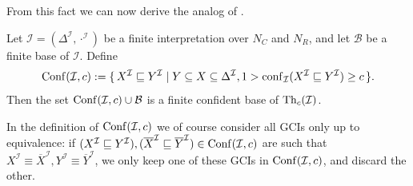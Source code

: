 From this fact we can now derive the analog of .

\begin{Theorem}
  \label{thm:conf-base}
  Let $\mathcal{I} = (\Delta^{\mathcal{I}}, \cdot^{\mathcal{I}})$ be a finite
  interpretation over $N_C$ and $N_R$, and let $\mathcal{B}$ be a finite base of
  $\mathcal{I}$.  Define
  \begin{equation*}
    \operatorname{Conf}(\mathcal{I}, c) := {\{\, X^{\mathcal{I}} \sqsubseteq Y^{\mathcal{I}} \mid Y
      \subseteq X \subseteq \Delta^{\mathcal{I}}, 1 > \operatorname{conf}_{\mathcal{I}}( X^{\mathcal{I}}
      \sqsubseteq Y^{\mathcal{I}} ) \ge c \,\}}.
  \end{equation*}
  Then the set $\operatorname{Conf}(\mathcal{I}, c) \cup \mathcal{B}$ is a finite confident base of
  $\operatorname{Th}_c(\mathcal{I})$.
\end{Theorem}

In the definition of $\operatorname{Conf}(\mathcal{I}, c)$ we of course consider all GCIs only up to
equivalence: if $(X^{\mathcal{I}} \sqsubseteq Y^{\mathcal{I}}), (\overline X^{\mathcal{I}}
\sqsubseteq \overline Y^{\mathcal{I}}) \in \operatorname{Conf}(\mathcal{I}, c)$ are such that
$X^{\mathcal{I}} \equiv \overline X^{\mathcal{I}}, Y^{\mathcal{I}} \equiv \overline
Y^{\mathcal{I}}$, we only keep one of these GCIs in $\operatorname{Conf}(\mathcal{I}, c)$, and discard
the other.

